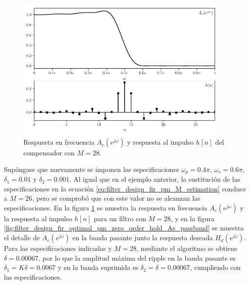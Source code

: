 \documentclass[a4paper]{report}
\begin{document}
\begin{figure}[!htb]
 \begin{center}
 \includegraphics[width=0.95\textwidth]{figuras/filter_design_fir_optimal_pm_zero_order_hold_Ae_h.pdf}
 \caption{\label{fig:filter_design_fir_optimal_pm_zero_order_hold_Ae_h} Respuesta en frecuencia \(A_e(e^{j\omega})\) y respuesta al impulso \(h[n]\) del compensador con \(M=28\).}
 \end{center}
\end{figure}
Supóngase que nuevamente se imponen las especificaciones \(\omega_p=0.4\pi\), \(\omega_s=0.6\pi\), \(\delta_1=0.01\) y \(\delta_2=0.001\). Al igual que en el ejemplo anterior, la sustitución de las especificaciones en la ecuación \ref{eq:filter_design_fir_pm_M_estimation} conduce a \(M=26\), pero se comprobó que con este valor no se alcanzan las especificaciones. En la figura \ref{fig:filter_design_fir_optimal_pm_zero_order_hold_Ae_h} se muestra la respuesta en frecuencia \(A_e(e^{j\omega})\) y la respuesta al impulso \(h[n]\) para un filtro con \(M=28\), y en la figura \ref{fig:filter_design_fir_optimal_pm_zero_order_hold_Ae_passband} se muestra el detalle de \(A_e(e^{j\omega})\)  en la banda pasante junto la respuesta deseada \(H_d(e^{j\omega})\). Para las especificaciones indicadas y \(M=28\), mediante el algoritmo se obtiene \(\delta=0.00067\), por lo que la amplitud máxima del ripple en la banda pasante es \(\delta_1=K\delta=0.0067\) y en la banda suprimida es \(\delta_2=\delta=0.00067\), cumpliendo con las especificaciones.
\end{document}
